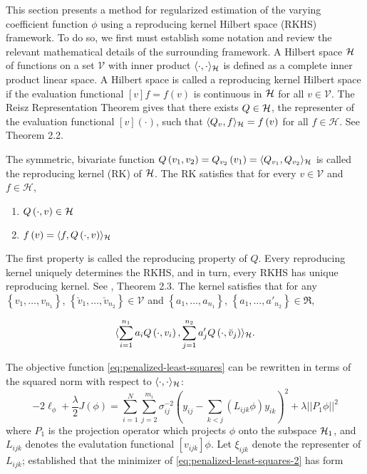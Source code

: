 This section presents a method for regularized estimation of the varying coefficient function $\phi$ using a reproducing kernel Hilbert space (RKHS) framework. To do so, we first must establish some notation and review the relevant mathematical details of the surrounding framework. A Hilbert space $\mathcal{H}$ of functions on a set $\mathcal{V}$ with inner product $\langle \cdot, \cdot\rangle_{\mathcal{H}}$ is defined as a complete inner product linear space. A Hilbert space is called a reproducing kernel Hilbert space if the evaluation functional $\left[v\right]f = f\left(v\right)$ is continuous in $\mathcal{H}$ for all $v \in \mathcal{V}$. The Reisz Representation Theorem gives that there exists $Q \in \mathcal{H}$, the representer of the evaluation functional $\left[v\right]\left(\cdot\right)$, such that $\langle Q_v, f \rangle_{\mathcal{H}} = f\left(v\right)$ for all $f \in \mathcal{H}$. See \citet{gu2013smoothing} Theorem 2.2.

\bigskip

The symmetric, bivariate function $Q\left(v_1, v_2 \right) = Q_{v_2 }\left(v_1\right) = \langle Q_{v_1}, Q_{v_2} \rangle_{\mathcal{H}}$ is called the reproducing kernel (RK) of $\mathcal{H}$. The RK satisfies that for every $v \in \mathcal{V}$ and $f \in \mathcal{H}$,

\begin{enumerate}
\item $Q\left(\cdot, v \right) \in \mathcal{H}$ 
\item $f\left(v\right) = \langle f, Q\left(\cdot, v\right)\rangle_{\mathcal{H}}$\label{rkhs-reproducing-property}
\end{enumerate}
\noindent
The first property is called the reproducing property of $Q$. Every reproducing kernel uniquely determines the RKHS, and in turn, every RKHS has unique reproducing kernel. See \citet{gu2013smoothing}, Theorem 2.3. The kernel satisfies that for any $\left\{v_1,\dots, v_{n_1}\right\}$, $\left\{\breve{v}_1,\dots, \breve{v}_{n_2}\right\} \in \mathcal{V}$ and $\left\{a_1,\dots, a_{n_1}\right\}$, $\left\{a_1,\dots, a'_{n_2}\right\} \in \Re$,

\begin{equation}
 \langle\sum_{i = 1}^{n_1} a_i Q\left(\cdot, v_i\right), \sum_{j = 1}^{n_2} a'_j Q\left(\cdot, \breve{v}_j\right) \rangle_{\mathcal{H}}.
\end{equation}

The objective function \ref{eq:penalized-least-squares} can be rewritten in terms of the squared norm with respect to $\langle\cdot,\cdot\rangle_{\mathcal{H}}$:
\begin{equation} \label{eq:penalized-least-squares-2}
-2\ell_\phi + \frac{\lambda}{2} J\left(\phi\right) = \sum_{i=1}^N \sum_{j=2}^{m_i} \sigma^{-2}_{ij}\left( y_{ij} - \sum_{k<j}\left( L_{ijk}\phi\right) y_{ik}  \right)^2 + \lambda \vert\vert P_1 \phi \vert \vert^2
\end{equation}
\noindent
where $P_1$ is the projection operator which projects $\phi$ onto the subspace $\mathcal{H}_1$, and $L_{ijk}$ denotes the evalutation functional $\left[v_{ijk}\right] \phi$. Let $\xi_{ijk}$ denote the representer of $L_{ijk}$; \citet{kimeldorf1971some} established that the minimizer of \ref{eq:penalized-least-squares-2} has form

